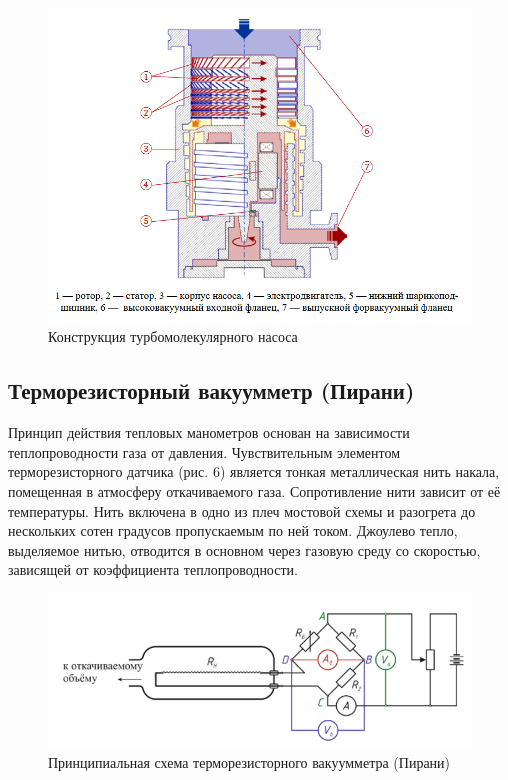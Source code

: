 \documentclass[14pt, a4paper]{report}
\begin{document}
\begin{figure}[!ht]
\centering
\includegraphics[scale=0.5]{terma5_04.png}
\caption{Конструкция турбомолекулярного насоса}
\end{figure}

\subsection{Терморезисторный вакуумметр (Пирани)}

Принцип действия тепловых манометров основан на зависимости теплопроводности газа от давления. Чувствительным элементом терморезисторного датчика (рис. 6) является тонкая металлическая нить накала, помещенная в атмосферу откачиваемого газа. Сопротивление нити зависит от её температуры. Нить включена в одно из плеч мостовой схемы и разогрета до нескольких сотен градусов пропускаемым по ней током. Джоулево тепло, выделяемое нитью, отводится в основном через газовую среду со скоростью, зависящей от коэффициента теплопроводности.

\begin{figure}[!ht]
\centering
\includegraphics[scale=0.5]{terma5_05.png}
\caption{Принципиальная схема терморезисторного вакуумметра (Пирани)}
\end{figure}
\end{document}
